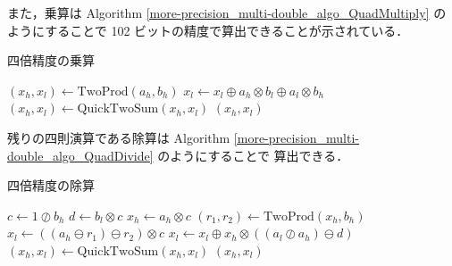 また，乗算は
Algorithm \ref{more-precision_multi-double_algo_QuadMultiply} のようにすることで
102 ビットの精度で算出できることが示されている\cite{Naoya2012}．

\begin{algorithm}[tp]
    \caption{四倍精度の乗算\cite{Hisashi2006,Naoya2012}}
    \label{more-precision_multi-double_algo_QuadMultiply}
    \begin{algorithmic}[1]
        \State $(x_h, x_l) \gets \text{TwoProd}(a_h, b_h)$
        \State $x_l \gets x_l \oplus a_h \otimes b_l \oplus a_l \otimes b_h$
        \State $(x_h, x_l) \gets \text{QuickTwoSum}(x_h, x_l)$
        \State \Return $(x_h, x_l)$
        \EndProcedure
    \end{algorithmic}
\end{algorithm}

残りの四則演算である除算は
Algorithm \ref{more-precision_multi-double_algo_QuadDivide} のようにすることで
算出できる\cite{Naoya2012s}．

\begin{algorithm}[tp]
    \caption{四倍精度の除算\cite{Naoya2012s}}
    \label{more-precision_multi-double_algo_QuadDivide}
    \begin{algorithmic}[1]
        \State $c \gets 1 \oslash b_h$
        \State $d \gets b_l \otimes c$
        \State $x_h \gets a_h \otimes c$
        \State $(r_1, r_2) \gets \text{TwoProd}(x_h, b_h)$
        \State $x_l \gets ((a_h \ominus r_1) \ominus r_2) \otimes c$
        \State $x_l \gets x_l \oplus x_h \otimes ((a_l \oslash a_h) \ominus d)$
        \State $(x_h, x_l) \gets \text{QuickTwoSum}(x_h, x_l)$
        \State \Return $(x_h, x_l)$
        \EndProcedure
    \end{algorithmic}
\end{algorithm}
